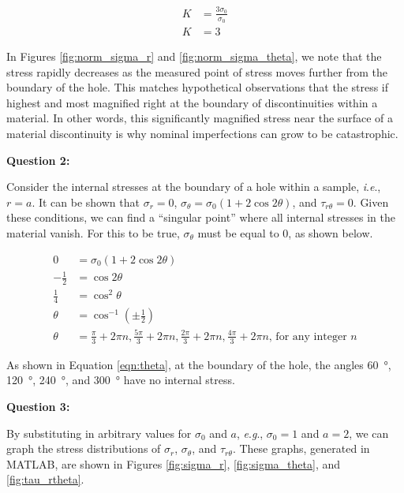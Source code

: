 \documentclass[12 pt]{article}
\newcommand{\ie}{\textit{i}.\textit{e}., }
\newcommand{\eg}{\textit{e}.\textit{g}., }
\begin{document}
\begin{align}
K&=\frac{3\sigma_0}{\sigma_0} \\
K&=3
\end{align}

In Figures \ref{fig:norm_sigma_r} and \ref{fig:norm_sigma_theta}, we note that the stress rapidly decreases as the measured point of stress moves further from the boundary of the hole. This matches hypothetical observations that the stress if highest and most magnified right at the boundary of discontinuities within a material. In other words, this significantly magnified stress near the surface of a material discontinuity is why nominal imperfections can grow to be catastrophic.

\textbf{Question 2:}

Consider the internal stresses at the boundary of a hole within a sample, \ie $r=a$. It can be shown that $\sigma_r=0$, $\sigma_\theta=\sigma_0\left(1+2\cos2\theta\right)$, and $\tau_{r\theta}=0$. Given these conditions, we can find a ``singular point'' where all internal stresses in the material vanish. For this to be true, $\sigma_\theta$ must be equal to \num{0}, as shown below.

\begin{align}
0&=\sigma_0\left(1+2\cos2\theta\right) \\
-\frac{1}{2}&=\cos2\theta \\
\frac{1}{4}&=\cos^2\theta \\
\theta&=\cos^{-1}\left({\pm\frac{1}{2}}\right) \\
\theta&=\frac{\pi}{3}+2{\pi}n,\frac{5\pi}{3}+2{\pi}n,\frac{2\pi}{3}+2{\pi}n,\frac{4\pi}{3}+2{\pi}n\text{, for any integer }n \label{eqn:theta}
\end{align}

As shown in Equation \ref{eqn:theta}, at the boundary of the hole, the angles \qty{60}{\degree}, \qty{120}{\degree}, \qty{240}{\degree}, and \qty{300}{\degree} have no internal stress.

\textbf{Question 3:}

By substituting in arbitrary values for $\sigma_0$ and $a$, \eg $\sigma_0=1$ and $a=2$, we can graph the stress distributions of $\sigma_r$, $\sigma_\theta$, and $\tau_{r\theta}$. These graphs, generated in MATLAB, are shown in Figures \ref{fig:sigma_r}, \ref{fig:sigma_theta}, and \ref{fig:tau_rtheta}.
\end{document}
